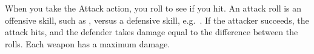 
When you take the Attack action, you roll to see if you hit. An attack roll is an offensive skill, such as , versus a defensive skill, e.g.\ . If the attacker succeeds, the attack hits, and the defender takes damage equal to the difference between the rolls. Each weapon has a maximum damage.
